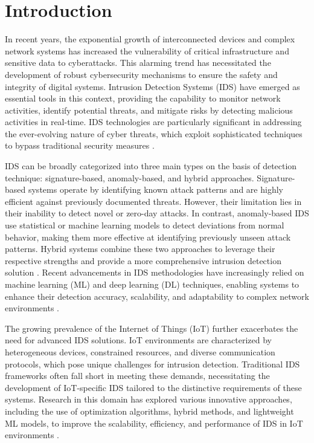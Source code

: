 \documentclass[pdflatex,sn-mathphys-num]{sn-jnl}%
\theoremstyle{thmstyleone}%
\theoremstyle{thmstyletwo}%
\theoremstyle{thmstylethree}%
\begin{document}
\section{Introduction}\label{sec:Intro}

In recent years, the exponential growth of interconnected devices and complex network systems has increased the vulnerability of critical infrastructure and sensitive data to cyberattacks. This alarming trend has necessitated the development of robust cybersecurity mechanisms to ensure the safety and integrity of digital systems. Intrusion Detection Systems (IDS) have emerged as essential tools in this context, providing the capability to monitor network activities, identify potential threats, and mitigate risks by detecting malicious activities in real-time. IDS technologies are particularly significant in addressing the ever-evolving nature of cyber threats, which exploit sophisticated techniques to bypass traditional security measures \cite{IDS1, IDS3}.

IDS can be broadly categorized into three main types on the basis of detection technique: signature-based, anomaly-based, and hybrid approaches. Signature-based systems operate by identifying known attack patterns and are highly efficient against previously documented threats. However, their limitation lies in their inability to detect novel or zero-day attacks. In contrast, anomaly-based IDS use statistical or machine learning models to detect deviations from normal behavior, making them more effective at identifying previously unseen attack patterns. Hybrid systems combine these two approaches to leverage their respective strengths and provide a more comprehensive intrusion detection solution \cite{IDS2, IDS6}. Recent advancements in IDS methodologies have increasingly relied on machine learning (ML) and deep learning (DL) techniques, enabling systems to enhance their detection accuracy, scalability, and adaptability to complex network environments \cite{IDS4, IDS14, IDS15}.


The growing prevalence of the Internet of Things (IoT) further exacerbates the need for advanced IDS solutions. IoT environments are characterized by heterogeneous devices, constrained resources, and diverse communication protocols, which pose unique challenges for intrusion detection. Traditional IDS frameworks often fall short in meeting these demands, necessitating the development of IoT-specific IDS tailored to the distinctive requirements of these systems. Research in this domain has explored various innovative approaches, including the use of optimization algorithms, hybrid methods, and lightweight ML models, to improve the scalability, efficiency, and performance of IDS in IoT environments \cite{IDS5, IDS15}.
\end{document}
